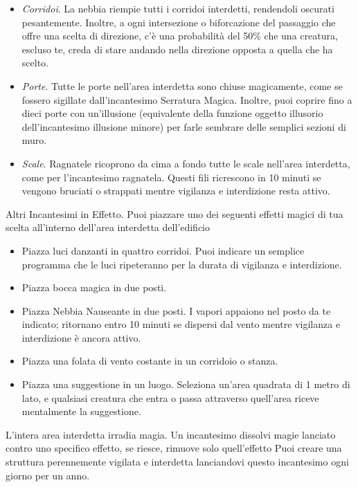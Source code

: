 \begin{multicols}{2}
\begin{itemize}[leftmargin=*] \setlength{\itemsep}{0pt}

	\item \emph{Corridoi}. La nebbia riempie tutti i corridoi interdetti, rendendoli oscurati pesantemente. Inoltre, a ogni intersezione o biforcazione del passaggio che offre una scelta di direzione, c'è una probabilità del 50\% che una creatura, escluso te, creda di stare andando nella direzione opposta a quella che ha scelto.
	\item \emph{Porte}. Tutte le porte nell'area interdetta sono chiuse magicamente, come se fossero sigillate dall'incantesimo Serratura Magica. Inoltre, puoi coprire fino a dieci porte con un'illusione (equivalente della funzione oggetto illusorio dell'incantesimo illusione minore) per farle sembrare delle semplici sezioni di muro.
	\item \emph{Scale}. Ragnatele ricoprono da cima a fondo tutte le scale nell'area interdetta, come per l'incantesimo ragnatela. Questi fili ricrescono in 10 minuti se vengono bruciati o strappati mentre vigilanza e interdizione resta attivo.
\end{itemize}

Altri Incantesimi in Effetto. Puoi piazzare uno dei seguenti effetti magici di tua scelta all'interno dell'area interdetta dell'edificio

\begin{itemize}[leftmargin=*] \setlength{\itemsep}{0pt}
	\item Piazza luci danzanti in quattro corridoi. Puoi indicare un semplice programma che le luci ripeteranno per la durata di vigilanza e interdizione.
	\item Piazza bocca magica in due posti.
	\item Piazza Nebbia Nauseante in due posti. I vapori appaiono nel posto da te indicato; ritornano entro 10 minuti se dispersi dal vento mentre vigilanza e interdizione è ancora attivo.
	\item Piazza una folata di vento costante in un corridoio o stanza.
	\item Piazza una suggestione in un luogo. Seleziona un'area quadrata di 1 metro di lato, e qualsiasi creatura che entra o passa attraverso quell'area riceve mentalmente la suggestione.
\end{itemize}

L'intera area interdetta irradia magia. Un incantesimo dissolvi magie lanciato contro uno specifico effetto, se riesce, rimuove solo quell'effetto Puoi creare una struttura perennemente vigilata e interdetta lanciandovi questo incantesimo ogni giorno per un anno.


\end{multicols}
